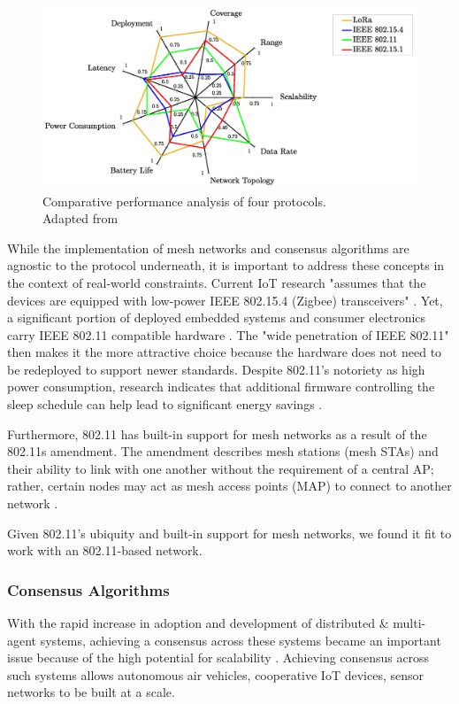 \begin{figure}[H]
    \centering
    \includegraphics[width=0.8\columnwidth]{images/comp_perf_analysis.png}
    \caption{Comparative performance analysis of four protocols. \\ Adapted from \cite{iot_survey_cilfone2019wireless}}
    \label{fig:comparison_protocols}
\end{figure}


While the implementation of mesh networks and consensus algorithms are agnostic to the protocol underneath, it is important to address these concepts in the context of real-world constraints. Current IoT research "assumes that the devices are equipped with low-power IEEE 802.15.4 (Zigbee) transceivers" \cite{disney_glaropoulos2013enhanced}. Yet, a significant portion of deployed embedded systems and consumer electronics carry IEEE 802.11 compatible hardware \cite{disney_glaropoulos2013enhanced}. 
The "wide penetration of IEEE 802.11" \cite{disney_glaropoulos2013enhanced} then makes it the more attractive choice because the hardware does not need to be redeployed to support newer standards. Despite 802.11's notoriety as high power consumption, research indicates that additional firmware controlling the sleep schedule can help lead to significant energy savings \cite{disney_glaropoulos2013enhanced, barghi2019practicalpower}.

Furthermore, 802.11 has built-in support for mesh networks as a result of the 802.11s amendment. The amendment describes mesh stations (mesh STAs) and their ability to link with one another without the requirement of a central AP; rather, certain nodes may act as mesh access points (MAP) to connect to another network \cite{iov_wu2016internet, optical_zeitgeist_laboratory_2011}.

Given 802.11's ubiquity and built-in support for mesh networks, we found it fit to work with an 802.11-based network.

\subsubsection{Consensus Algorithms}
\label{conceptualization_consensus}
With the rapid increase in adoption and development of distributed \& multi-agent systems, achieving a consensus across these systems became an important issue because of the high potential for scalability \cite{Ge_Han_Ding_Zhang_Ning_2018}. Achieving consensus across such systems allows autonomous air vehicles, cooperative IoT devices, sensor networks to be built at a scale. 


